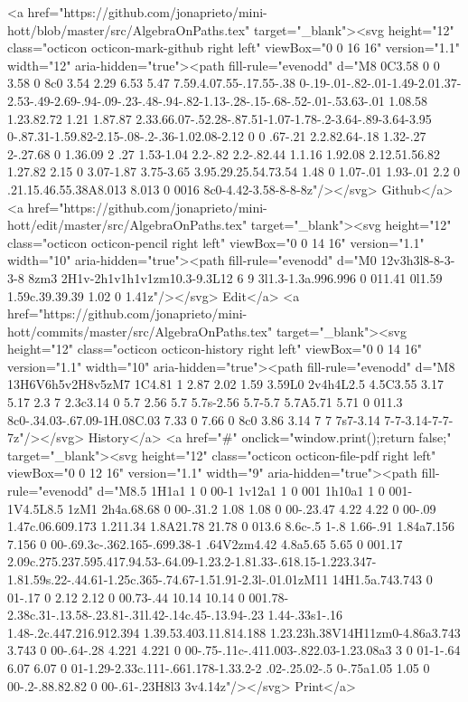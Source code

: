       <a href="https://github.com/jonaprieto/mini-hott/blob/master/src/AlgebraOnPaths.tex" target="_blank"><svg height="12" class="octicon octicon-mark-github right left" viewBox="0 0 16 16" version="1.1" width="12" aria-hidden="true"><path fill-rule="evenodd" d="M8 0C3.58 0 0 3.58 0 8c0 3.54 2.29 6.53 5.47 7.59.4.07.55-.17.55-.38 0-.19-.01-.82-.01-1.49-2.01.37-2.53-.49-2.69-.94-.09-.23-.48-.94-.82-1.13-.28-.15-.68-.52-.01-.53.63-.01 1.08.58 1.23.82.72 1.21 1.87.87 2.33.66.07-.52.28-.87.51-1.07-1.78-.2-3.64-.89-3.64-3.95 0-.87.31-1.59.82-2.15-.08-.2-.36-1.02.08-2.12 0 0 .67-.21 2.2.82.64-.18 1.32-.27 2-.27.68 0 1.36.09 2 .27 1.53-1.04 2.2-.82 2.2-.82.44 1.1.16 1.92.08 2.12.51.56.82 1.27.82 2.15 0 3.07-1.87 3.75-3.65 3.95.29.25.54.73.54 1.48 0 1.07-.01 1.93-.01 2.2 0 .21.15.46.55.38A8.013 8.013 0 0016 8c0-4.42-3.58-8-8-8z"/></svg> Github</a>
      <a href="https://github.com/jonaprieto/mini-hott/edit/master/src/AlgebraOnPaths.tex" target="_blank"><svg height="12" class="octicon octicon-pencil right left" viewBox="0 0 14 16" version="1.1" width="10" aria-hidden="true"><path fill-rule="evenodd" d="M0 12v3h3l8-8-3-3-8 8zm3 2H1v-2h1v1h1v1zm10.3-9.3L12 6 9 3l1.3-1.3a.996.996 0 011.41 0l1.59 1.59c.39.39.39 1.02 0 1.41z"/></svg> Edit</a>
      <a href="https://github.com/jonaprieto/mini-hott/commits/master/src/AlgebraOnPaths.tex" target="_blank"><svg height="12" class="octicon octicon-history right left" viewBox="0 0 14 16" version="1.1" width="10" aria-hidden="true"><path fill-rule="evenodd" d="M8 13H6V6h5v2H8v5zM7 1C4.81 1 2.87 2.02 1.59 3.59L0 2v4h4L2.5 4.5C3.55 3.17 5.17 2.3 7 2.3c3.14 0 5.7 2.56 5.7 5.7s-2.56 5.7-5.7 5.7A5.71 5.71 0 011.3 8c0-.34.03-.67.09-1H.08C.03 7.33 0 7.66 0 8c0 3.86 3.14 7 7 7s7-3.14 7-7-3.14-7-7-7z"/></svg> History</a>
      <a  href="#" onclick="window.print();return false;" target="_blank"><svg height="12" class="octicon octicon-file-pdf right left" viewBox="0 0 12 16" version="1.1" width="9" aria-hidden="true"><path fill-rule="evenodd" d="M8.5 1H1a1 1 0 00-1 1v12a1 1 0 001 1h10a1 1 0 001-1V4.5L8.5 1zM1 2h4a.68.68 0 00-.31.2 1.08 1.08 0 00-.23.47 4.22 4.22 0 00-.09 1.47c.06.609.173 1.211.34 1.8A21.78 21.78 0 013.6 8.6c-.5 1-.8 1.66-.91 1.84a7.156 7.156 0 00-.69.3c-.362.165-.699.38-1 .64V2zm4.42 4.8a5.65 5.65 0 001.17 2.09c.275.237.595.417.94.53-.64.09-1.23.2-1.81.33-.618.15-1.223.347-1.81.59s.22-.44.61-1.25c.365-.74.67-1.51.91-2.3l-.01.01zM11 14H1.5a.743.743 0 01-.17 0 2.12 2.12 0 00.73-.44 10.14 10.14 0 001.78-2.38c.31-.13.58-.23.81-.31l.42-.14c.45-.13.94-.23 1.44-.33s1-.16 1.48-.2c.447.216.912.394 1.39.53.403.11.814.188 1.23.23h.38V14H11zm0-4.86a3.743 3.743 0 00-.64-.28 4.221 4.221 0 00-.75-.11c-.411.003-.822.03-1.23.08a3 3 0 01-1-.64 6.07 6.07 0 01-1.29-2.33c.111-.661.178-1.33.2-2 .02-.25.02-.5 0-.75a1.05 1.05 0 00-.2-.88.82.82 0 00-.61-.23H8l3 3v4.14z"/></svg> Print</a>

